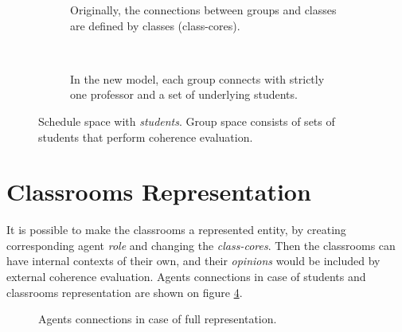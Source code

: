 \documentclass[ThesisDoc]{subfiles}
\providecommand{\rootdir}{.}
\begin{document}
\begin{figure}[h]
  \begin{subfigure}{0.36\textwidth}
    \resizebox{\linewidth}{!}{
      
    }
    \caption{Originally, the connections between groups and classes are
             defined by classes (class-cores).}
  \end{subfigure}
  ~
  \begin{subfigure}{0.64\textwidth}
    \resizebox{\linewidth}{!}{
      
    }
    \caption{In the new model, each group connects with strictly one professor
             and a set of underlying students.}
    \label{}
  \end{subfigure}
  \caption{}
  \label{fig:ConnectionMatrixDiff}
\end{figure}


\begin{figure}[b]
  \centering
  \resizebox{\textwidth}{!}{
    
  }
  \caption{Schedule space with \emph{students}. Group space consists of
           sets of students that perform coherence evaluation. }
  \label{fig:ScheduleHypercube-S}
\end{figure}


\section{Classrooms Representation}
It is possible to make the classrooms a represented entity, by creating
corresponding agent \emph{role} and changing the \emph{class-cores}.
Then the classrooms can have internal contexts of their own, and their
\emph{opinions} would be included by external coherence evaluation.
Agents connections in case of students and classrooms representation are shown
on figure \ref{fig:ConnectionMatrixAll}.
\begin{figure}[h]
  \resizebox{\textwidth}{!}{
    
  }
  \caption{Agents connections in case of full representation.}
  \label{fig:ConnectionMatrixAll}
\end{figure}
\end{document}
